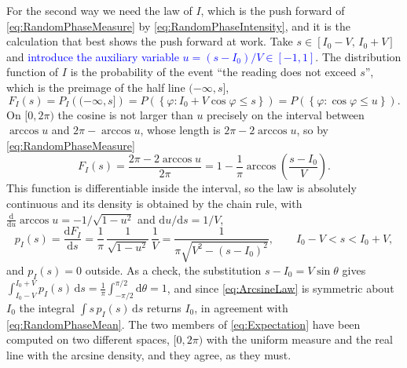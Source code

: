 		For the second way we need the law of $I$, which is the push forward of
		\eqref{eq:RandomPhaseMeasure} by \eqref{eq:RandomPhaseIntensity}, and it is the
		calculation that best shows the push forward at work. Take $s\in[I_{0}-V,\,I_{0}+V]$ and
		\textcolor{blue}{introduce the auxiliary variable $u = (s-I_{0})/V\in[-1,1]$}. The
		distribution function of $I$ is the probability of the event ``the reading does not
		exceed $s$'', which is the preimage of the half line $(-\infty,s]$,
		\begin{equation*}
			F_{I}(s) = P_{I}\left((-\infty,s]\right) = P\left(\left\{\varphi : I_{0} + V\cos\varphi\leq s\right\}\right)
			= P\left(\left\{\varphi : \cos\varphi\leq u\right\}\right).
		\end{equation*}
		On $[0,2\pi)$ the cosine is not larger than $u$ precisely on the interval between
		$\arccos u$ and $2\pi - \arccos u$, whose length is $2\pi - 2\arccos u$, so by
		\eqref{eq:RandomPhaseMeasure}
		\begin{equation*}
			F_{I}(s) = \frac{2\pi - 2\arccos u}{2\pi} = 1 - \frac{1}{\pi}\arccos\left(\frac{s-I_{0}}{V}\right).
		\end{equation*}
		This function is differentiable inside the interval, so the law is absolutely
		continuous and its density is obtained by the chain rule, with
		$\frac{\mathrm{d}}{\mathrm{d}u}\arccos u = -1/\sqrt{1-u^{2}}$ and $\mathrm{d}u/\mathrm{d}s = 1/V$,
		\begin{equation}\label{eq:ArcsineLaw}
			p_{I}(s) = \frac{\mathrm{d}F_{I}}{\mathrm{d}s}
			= \frac{1}{\pi}\,\frac{1}{\sqrt{1-u^{2}}}\,\frac{1}{V}
			= \frac{1}{\pi\sqrt{V^{2}-\left(s-I_{0}\right)^{2}}},
			\qquad I_{0}-V< s< I_{0}+V,
		\end{equation}
		and $p_{I}(s) = 0$ outside. As a check, the substitution $s - I_{0} = V\sin\theta$ gives
		$\int_{I_{0}-V}^{I_{0}+V}p_{I}(s)\,\mathrm{d}s = \frac{1}{\pi}\int_{-\pi/2}^{\pi/2}\mathrm{d}\theta = 1$,
		and since \eqref{eq:ArcsineLaw} is symmetric about $I_{0}$ the integral
		$\int s\,p_{I}(s)\,\mathrm{d}s$ returns $I_{0}$, in agreement with \eqref{eq:RandomPhaseMean}.
		The two members of \eqref{eq:Expectation} have been computed on two different spaces,
		$[0,2\pi)$ with the uniform measure and the real line with the arcsine density, and they
		agree, as they must.

